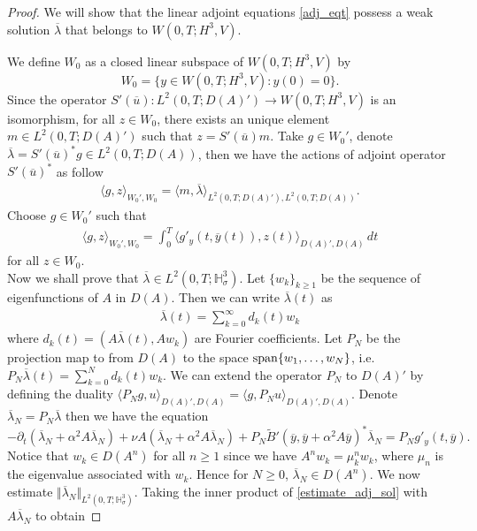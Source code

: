 \documentclass[reqno]{amsart}
\begin{document}
	\begin{proof}
		We will show that the linear adjoint equations \eqref{adj_eqt} possess a weak solution $\overline{\lambda}$ that belongs to $W(0,T;H^3,V)$.
		
		We define $W_0$ as a closed linear subspace of $W(0,T;H^3,V)$ by
		\begin{equation*}
			W_0=\{y\in W(0,T;H^3,V): y(0)=0\}.
		\end{equation*}
		Since the operator $S'(\overline{u}): L^2(0,T;D(A)') \to W(0,T;H^3,V)$ is an isomorphism, for all $z \in W_0$, there exists an unique element $m \in L^{2}(0,T;D(A)')$ such that $z=S'(\overline{u})m$. Take $g \in W_0'$, denote $\overline{\lambda} = S'(\overline{u})^*g\in L^2(0,T;D(A))$, then we have the actions of adjoint operator $S'(\overline{u})^*$ as follow
		\begin{align}\label{4.4}
			\langle g, z \rangle_{W_0',W_0} = \langle m,\overline{\lambda}\rangle_{L^2(0,T;D(A)'),L^2(0,T;D(A))}.
		\end{align}
		Choose $g \in W_0'$ such that
		\begin{align}\label{4.5}
			\langle g,z \rangle_{W_0',W_0}= \int_0^T\langle g'_y(t,\overline{y}(t)), z(t) \rangle_{D(A)',D(A)}\,dt
		\end{align}
		for all $z \in W_0$.\\
		Now we shall prove that $\overline{\lambda} \in L^2(0,T;\mathbb{H}^3_\sigma)$. Let $\{w_k\}_{k\geq1}$ be the sequence of eigenfunctions of $A$ in $D(A)$. Then we can write $\overline{\lambda}(t)$ as 
		\begin{align*}
			\overline{\lambda}(t) = \sum_{k=0}^\infty d_k(t)w_k
		\end{align*}
		where $d_k(t)=(A\overline{\lambda}(t),Aw_k)$ are Fourier coefficients. Let $P_N$ be the projection map to from $D(A)$ to the space ${\rm span}\{w_1,\hdots,w_N\}$, i.e. $P_N\overline{\lambda}(t) = \sum_{k=0}^N d_k(t)w_k$. We can extend the operator $P_N$ to $D(A)'$ by defining the duality $\langle P_Ng,u\rangle_{D(A)',D(A)}=\langle g,P_Nu\rangle_{D(A)',D(A)}$. Denote $\overline{\lambda}_N=P_N\overline{\lambda}$ then we have the equation 
		\begin{equation} \label{estimate_adj_sol}
			-\partial_t(\overline{\lambda}_N+\alpha^2A\overline{\lambda}_N)+\nu A (\overline{\lambda}_N+ \alpha^2 A \overline{\lambda}_N) +P_N\widetilde{B}'(\overline{y},\overline{y}+\alpha^2A\overline{y})^*\overline{\lambda}_N = P_Ng'_y(t,\overline{y}).
		\end{equation}
		Notice that $w_k\in D(A^n)$ for all $n\geq1$ since we have $A^nw_k=\mu_k^n w_k$, where $\mu_n$ is the eigenvalue associated with $w_k$. Hence for $N\geq 0$, $\overline{\lambda}_N\in D(A^n)$.  We now estimate $\Vert \overline{\lambda}_N \Vert_{L^2(0,T;\mathbb{H}^3_\sigma)}$. Taking the inner product of \eqref{estimate_adj_sol} with $A\overline{\lambda}_N$ to obtain

\end{proof}
\end{document}
